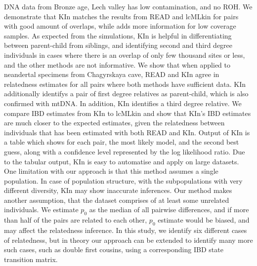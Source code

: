 \documentclass[12pt, letterpaper]{article}
\begin{document}
DNA data from Bronze age, Lech valley has low contamination, and no ROH. We demonstrate that KIn matches the results from READ and lcMLkin for pairs with good amount of overlaps, while adds more information for low coverage samples. As expected from the simulations, KIn is helpful in differentiating between parent-child from siblings, and identifying second and third degree individuals in cases where there is an overlap of only few thousand sites or less, and the other methods are not informative. We show that when applied to neandertal specimens from Chagyrskaya cave, READ and KIn agree in relatedness estimates for all pairs where both methods have sufficient data. KIn additionally identifys a pair of first degree relatives as parent-child, which is also confirmed with mtDNA. In addition, KIn identifies a third degree relative. We compare IBD estimates from KIn to lcMLkin and show that KIn's IBD estimates are much closer to the expected estimates, given the relatedness between individuals that has been estimated with both READ and KIn. 
Output of KIn is a table which shows for each pair, the most likely model, and the second best guess, along with a confidence level represented by the log likelihood ratio. Due to the tabular output, KIn is easy to automatise and apply on large datasets. 
One limitation with our approach is that this method assumes a single population. In case of population structure, with the subpopulations with very different diversity, KIn may show inaccurate inferences. Our method makes another assumption, that the dataset comprises of at least some unrelated individuals. We estimate $p_0$ as the median of all pairwise differences, and if more than half of the pairs are related to each other, $p_0$ estimate would be biased, and may affect the relatedness inference. In this study, we identify six different cases of relatedness, but in theory our approach can be extended to identify many more such cases, such as double first cousins, using a corresponding IBD state transition matrix.
\end{document}
